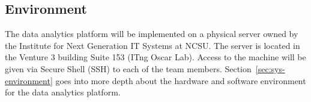 \subsection{Environment}
\label{sec:environment}

The data analytics platform will be implemented on a physical server
owned by the Institute for Next Generation IT Systems at NCSU. The server
is located in the Venture 3 building Suite 153 (ITng Oscar Lab). Access to
the machine will be given via Secure Shell (SSH) to each of the team members.
Section~\ref{sec:sys-environment} goes into more depth about the hardware and
software environment for the data analytics platform.
